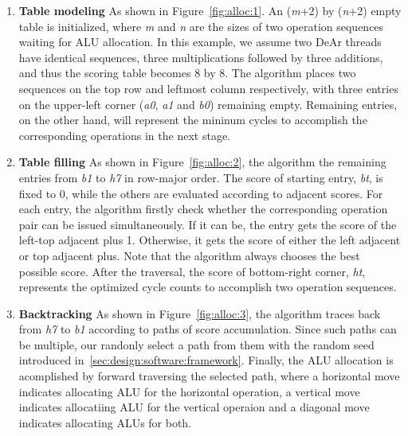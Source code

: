 \begin{enumerate}
    \item \textbf{Table modeling} As shown in Figure~\ref{fig:alloc:1}. An (\textit{m}+2) by (\textit{n}+2) empty table is initialized, 
        where \textit{m} and \textit{n} are the sizes of two operation sequences waiting for ALU allocation.
        In this example, we assume two DeAr threads have identical sequences, three multiplications followed by three additions, 
        and thus the scoring table becomes 8 by 8.
        The algorithm places two sequences on the top row and leftmost column respectively, 
        with three entries on the upper-left corner (\textit{a0}, \textit{a1} and \textit{b0}) remaining empty. 
        Remaining entries, on the other hand, will represent the mininum cycles to accomplish the corresponding operations in the next stage.
    \item \textbf{Table filling} As shown in Figure~\ref{fig:alloc:2}, the algorithm the remaining entries from \textit{b1} to \textit{h7} in row-major order.
        The score of starting entry, \textit{bt}, is fixed to 0, while the others are evaluated according to adjacent scores.
        For each entry, the algorithm firstly check whether the corresponding operation pair can be issued simultaneously.
        If it can be, the entry gets the score of the left-top adjacent plus 1.
        Otherwise, it gets the score of either the left adjacent or top adjacent plus.
        Note that the algorithm always chooses the best possible score.
        After the traversal, the score of bottom-right corner, \textit{ht}, represents the optimized cycle counts to accomplish two operation sequences.
    \item \textbf{Backtracking} As shown in Figure~\ref{fig:alloc:3}, the algorithm traces back from \textit{h7} to \textit{b1} according to paths of score accumulation.
        Since such paths can be multiple, our randonly select a path from them with the random seed introduced in~\ref{sec:design:software:framework}.
        Finally, the ALU allocation is acomplished by forward traversing the selected path, 
        where a horizontal move indicates allocating ALU for the horizontal operation,
        a vertical move indicates allocatiing ALU for the vertical operaion and a diagonal move indicates allocating ALUs for both.
\end{enumerate}

